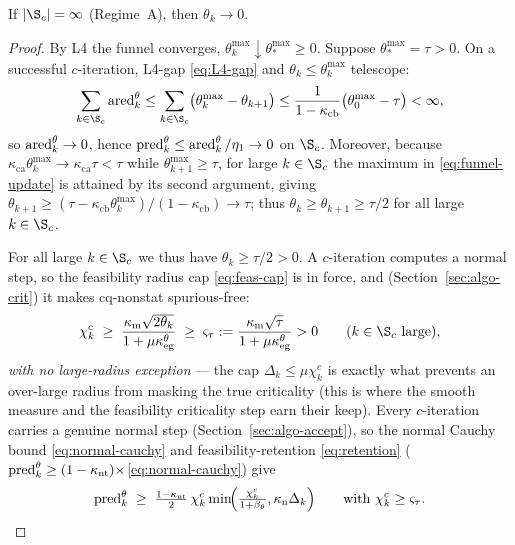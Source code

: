 \begin{lemma}
  \label{lem:feas-A}
  If $|\S_c|=\infty$ (Regime~A), then $\theta_k\to0$.
\end{lemma}
\begin{proof}
  By L4 the funnel converges, $\theta_k^{\max}\downarrow\theta_*^{\max}\ge0$. Suppose
  $\theta_*^{\max}=\tau>0$. On a successful $c$-iteration, L4-gap \eqref{eq:L4-gap}
  and $\theta_k\le\theta_k^{\max}$ telescope:
  \[
    \sum_{k\in\S_c}\ared^\theta_k
      \le\sum_{k\in\S_c}\bigl(\theta_k^{\max}-\theta_{k+1}\bigr)
      \le\frac{1}{1-\kappa_{\mathrm{cb}}}\bigl(\theta_0^{\max}-\tau\bigr)<\infty,
  \]
  so $\operatorname{ared}^\theta_k\to0$, hence $\operatorname{pred}^\theta_k\le\operatorname{ared}^\theta_k/\eta_1\to0$ on
  $\S_c$. Moreover, because $\kappa_{\mathrm{ca}}\theta_k^{\max}\to\kappa_{\mathrm{ca}}\tau<\tau$
  while $\theta_{k+1}^{\max}\ge\tau$, for large $k\in\S_c$ the maximum in
  \eqref{eq:funnel-update} is attained by its second argument, giving
  $\theta_{k+1}\ge(\tau-\kappa_{\mathrm{cb}}\theta_k^{\max})/(1-\kappa_{\mathrm{cb}})\to\tau$;
  thus $\theta_k\ge\theta_{k+1}\ge\tau/2$ for all large $k\in\S_c$.

  For all large $k\in\S_c$ we thus have $\theta_k\ge\tau/2>0$. A $c$-iteration
  computes a normal step, so the feasibility radius cap \eqref{eq:feas-cap} is in
  force, and (Section~\ref{sec:algo-crit}) it makes cq-nonstat spurious-free:
  \begin{equation}
    \label{eq:chi-tau}
    \chi_k^c\;\ge\;\frac{\kappa_{\mathrm m}\sqrt{2\theta_k}}{1+\mu\kappa_{\mathrm{eg}}^\theta}
      \;\ge\;\varsigma_\tau:=\frac{\kappa_{\mathrm m}\sqrt{\tau}}{1+\mu\kappa_{\mathrm{eg}}^\theta}>0
    \qquad(k\in\S_c\text{ large}),
  \end{equation}
  \emph{with no large-radius exception} --- the cap $\Delta_k\le\mu\chi_k^c$ is exactly
  what prevents an over-large radius from masking the true criticality (this is where
  the smooth measure and the feasibility criticality step earn their keep). Every
  $c$-iteration carries a genuine normal step (Section~\ref{sec:algo-accept}), so the
  normal Cauchy bound \eqref{eq:normal-cauchy} and feasibility-retention
  \eqref{eq:retention} ($\operatorname{pred}^\theta_k\ge(1-\kappa_{\mathrm{nt}})\times$\eqref{eq:normal-cauchy}) give
  \begin{equation}
    \label{eq:A-predtheta}
    \operatorname{pred}^\theta_k\;\ge\;\tfrac{1-\kappa_{\mathrm{nt}}}{2}\,\chi_k^c\min\!\Bigl(\tfrac{\chi_k^c}{1+\beta_\theta},\kappa_{\mathrm n}\Delta_k\Bigr)
    \qquad\text{with } \chi_k^c\ge\varsigma_\tau .
  \end{equation}


\end{proof}
